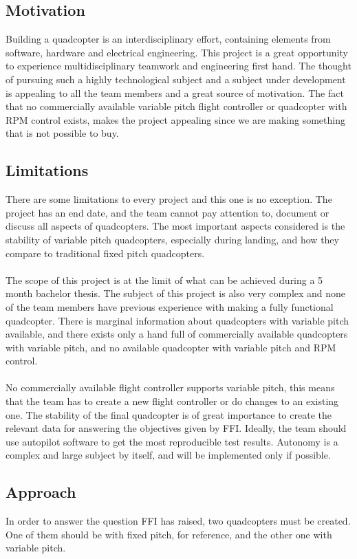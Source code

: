 \subsection{Motivation}
Building a quadcopter is an interdisciplinary effort, containing elements from software, hardware and electrical engineering. This project is a great opportunity to experience multidisciplinary teamwork and engineering first hand. The thought of pursuing such a highly technological subject and a subject under development is appealing to all the team members and a great source of motivation. The fact that no commercially available variable pitch flight controller or quadcopter with RPM control exists, makes the project appealing since we are making something that is not possible to buy.\\

\subsection{Limitations}
There are some limitations to every project and this one is no exception. The project has an end date, and the team cannot pay attention to, document or discuss all aspects of quadcopters. The most important aspects considered is the stability of variable pitch quadcopters, especially during landing, and how they compare to traditional fixed pitch quadcopters. \\
\\
The scope of this project is at the limit of what can be achieved during a 5 month bachelor thesis. The subject of this project is also very complex and none of the team members have previous experience with making a fully functional quadcopter. There is marginal information about quadcopters with variable pitch available, and there exists only a hand full of commercially available quadcopters with variable pitch, and no available quadcopter with variable pitch and RPM control. \\
\\
No commercially available flight controller supports variable pitch, this means that the team has to create a new flight controller or do changes to an existing one. The stability of the final quadcopter is of great importance to create the relevant data for answering the objectives given by FFI.  
Ideally, the team should use autopilot software to get the most reproducible test results. Autonomy is a complex and large subject by itself, and will be implemented only if possible. 

\subsection{Approach}
In order to answer the question FFI has raised, two quadcopters must be created. One of them should be with fixed pitch, for reference, and the other one with variable pitch. 


